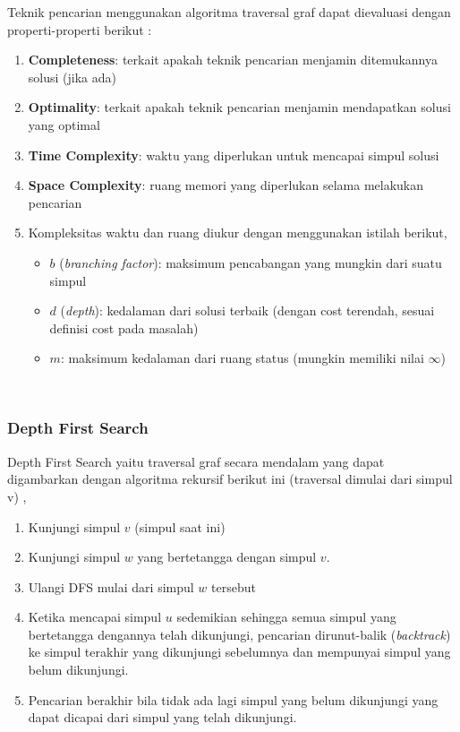 \documentclass[12pt,a4paper]{article}
\begin{document}
Teknik pencarian menggunakan algoritma traversal graf dapat dievaluasi dengan properti-properti berikut \cite{stima-graph-2}:
\begin{enumerate}    
    \item \textbf{Completeness}: terkait apakah teknik pencarian menjamin ditemukannya solusi (jika ada)
    \item \textbf{Optimality}: terkait apakah teknik pencarian menjamin mendapatkan solusi yang optimal
    \item \textbf{Time Complexity}: waktu yang diperlukan untuk mencapai simpul solusi
    \item \textbf{Space Complexity}: ruang memori yang diperlukan selama melakukan pencarian
    \item Kompleksitas waktu dan ruang diukur dengan menggunakan istilah berikut,
    \begin{itemize}
        \item $b$ (\textit{branching factor}): maksimum pencabangan yang mungkin dari suatu simpul
        \item $d$ (\textit{depth}): kedalaman dari solusi terbaik (dengan cost terendah, sesuai definisi cost pada masalah)
        \item $m$: maksimum kedalaman dari ruang status (mungkin memiliki nilai $\infty$)
    \end{itemize}
\end{enumerate} \\

\subsubsection{Depth First Search}

Depth First Search yaitu traversal graf secara mendalam yang dapat digambarkan dengan algoritma rekursif berikut ini (traversal dimulai dari simpul v) \cite{stima-graph-1},
\begin{enumerate}
    \item Kunjungi simpul $v$ (simpul saat ini)
    \item Kunjungi simpul $w$ yang bertetangga dengan simpul $v$.
    \item Ulangi DFS mulai dari simpul $w$ tersebut
    \item Ketika mencapai simpul $u$ sedemikian sehingga semua simpul yang bertetangga dengannya telah dikunjungi,
    pencarian dirunut-balik (\textit{backtrack}) ke simpul terakhir yang dikunjungi sebelumnya dan mempunyai simpul
    yang belum dikunjungi.
    \item Pencarian berakhir bila tidak ada lagi simpul yang belum dikunjungi yang dapat dicapai dari simpul yang
    telah dikunjungi.
\end{enumerate}
\end{document}
